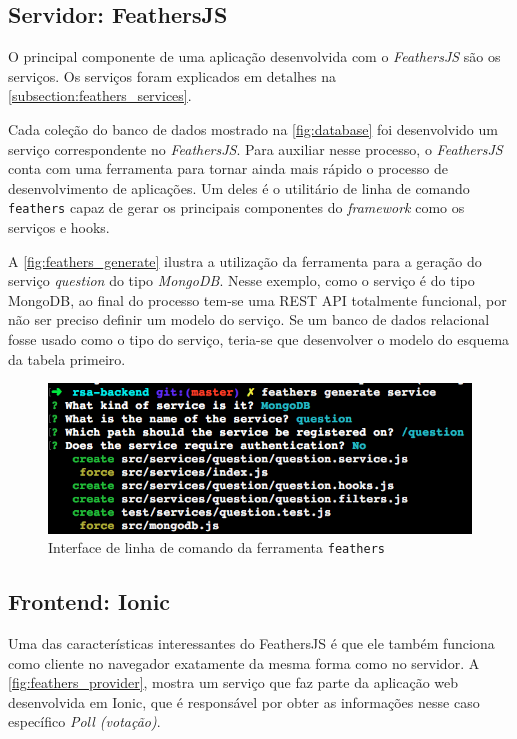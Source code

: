 \subsection{Servidor: FeathersJS}

O principal componente de uma aplicação desenvolvida com o \textit{FeathersJS} são os
serviços. Os serviços foram explicados em detalhes na \autoref{subsection:feathers_services}.

Cada coleção do banco de dados mostrado na \autoref{fig:database} foi desenvolvido um
serviço correspondente no \textit{FeathersJS}. Para auxiliar nesse processo, o \textit{FeathersJS} conta com
uma ferramenta para tornar ainda mais rápido o processo de desenvolvimento de aplicações.
Um deles é o utilitário de linha de comando \texttt{feathers} capaz de gerar
os principais componentes do \textit{framework} como os serviços e hooks.

A \autoref{fig:feathers_generate} ilustra a utilização da ferramenta para a geração do serviço
\textit{question} do tipo \textit{MongoDB}. Nesse exemplo, como o serviço é do tipo MongoDB, ao
final do processo tem-se uma REST API totalmente funcional, por não ser preciso definir um modelo do serviço.
Se um banco de dados relacional fosse usado como o tipo do serviço, teria-se que desenvolver o modelo do esquema da tabela primeiro.

\begin{figure}[!ht]
  \centering
  \caption{Interface de linha de comando da ferramenta \texttt{feathers}}
  \label{fig:feathers_generate}
  \includegraphics[scale=0.6,valign=t]{imagens/feathers_generate}
  \doautor
\end{figure}

\subsection{Frontend: Ionic}

Uma das características interessantes do FeathersJS é que ele também funciona
como cliente no navegador exatamente da mesma forma como no servidor.
A \autoref{fig:feathers_provider}, mostra um serviço que faz parte da aplicação web desenvolvida em Ionic,
que é responsável por obter as informações nesse caso específico \textit{Poll (votação)}.

